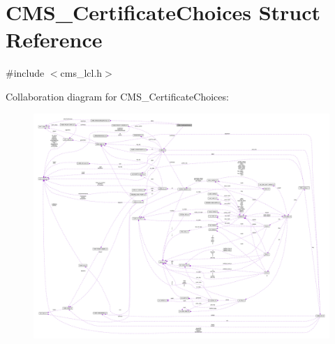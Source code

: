 \hypertarget{struct_c_m_s___certificate_choices}{}\section{C\+M\+S\+\_\+\+Certificate\+Choices Struct Reference}
\label{struct_c_m_s___certificate_choices}


{\ttfamily \#include $<$cms\+\_\+lcl.\+h$>$}



Collaboration diagram for C\+M\+S\+\_\+\+Certificate\+Choices\+:\nopagebreak
\begin{figure}[H]
\begin{center}
\leavevmode
\includegraphics[width=350pt]{struct_c_m_s___certificate_choices__coll__graph}
\end{center}
\end{figure}

